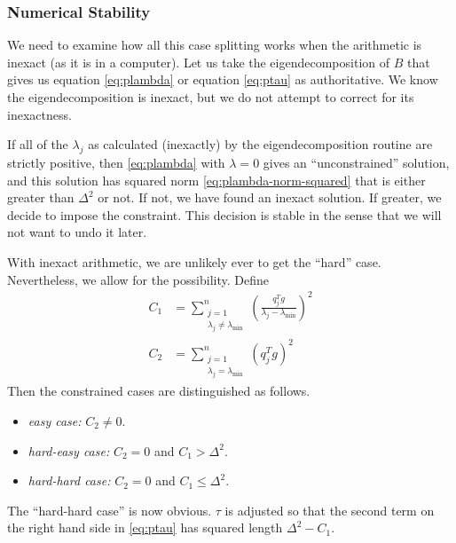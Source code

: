 \documentclass[11pt]{article}
\begin{document}
\subsubsection{Numerical Stability}

We need to examine how all this case splitting works when the
arithmetic is inexact (as it is in a computer).  Let us take
the eigendecomposition of $B$ that gives us equation \eqref{eq:plambda}
or equation \eqref{eq:ptau}
as authoritative.  We know the eigendecomposition is inexact,
but we do not attempt to
correct for its inexactness.

If all of the $\lambda_j$ as calculated (inexactly) by the eigendecomposition
routine are strictly positive, then \eqref{eq:plambda} with $\lambda = 0$
gives an ``unconstrained'' solution, and this solution has squared norm
\eqref{eq:plambda-norm-squared} that
is either greater than $\Delta^2$ or not.  If not, we have found an inexact
solution.  If greater, we decide to impose the constraint.
This decision is stable in the sense that we will not want to undo it later.

With inexact arithmetic, we are unlikely ever to get the ``hard'' case.
Nevertheless, we allow for the possibility.
Define
\begin{subequations}
\begin{align}
    C_1 & = 
   \sum_{\substack{j = 1 \\ \lambda_j \neq \lambda_{\text{min}}}}^n
   \left( \frac{q_j^T g}{\lambda_j - \lambda_{\text{min}}} \right)^2
   \label{eq:c1}
   \\
    C_2 & = 
   \sum_{\substack{j = 1 \\ \lambda_j = \lambda_{\text{min}}}}^n
   \left( q_j^T g \right)^2
   \label{eq:c2}
\end{align}
\end{subequations}
Then the constrained cases are distinguished as follows.
\begin{itemize}
\item \emph{easy case:} $C_2 \neq 0$.
\item \emph{hard-easy case:} $C_2 = 0$ and $C_1 > \Delta^2$.
\item \emph{hard-hard case:} $C_2 = 0$ and $C_1 \le \Delta^2$.
\end{itemize}

The ``hard-hard case'' is now obvious.  $\tau$ is adjusted so that
the second term on the right hand side in \eqref{eq:ptau} has squared length
$\Delta^2 - C_1$.
\end{document}
